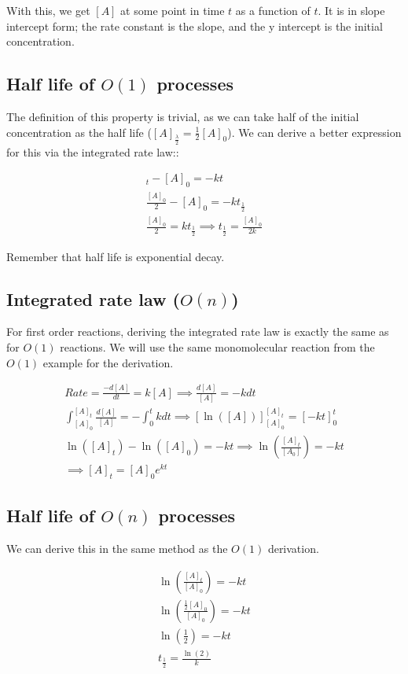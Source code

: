 \documentclass[12pt]{book}
\begin{document}
With this, we get $[A]$ at some point in time $t$ as a function of $t$. It is in slope intercept form; the rate constant is the slope, and the y intercept is the initial concentration.

\subsection*{Half life of $O(1)$ processes}

The definition of this property is trivial, as we can take half of the initial concentration as the half life ($[A]_{\frac{\lambda}{2}}=\frac{1}{2}[A]_0$). We can derive a better expression for this via the integrated rate law::

\begin{align}
    [A]_t-[A]_0=-kt\\
    \frac{[A]_0}{2}-[A]_0=-kt_{\frac{1}{2}}\\
    \frac{[A]_0}{2}=kt_{\frac{1}{2}}\implies t_{\frac{1}{2}}=\frac{[A]_0}{2k}
\end{align}

Remember that half life is exponential decay.

\subsection*{Integrated rate law ($O(n)$)}

For first order reactions, deriving the integrated rate law is exactly the same as for $O(1)$ reactions. We will use the same monomolecular reaction from the $O(1)$ example for the derivation.

\begin{align}
    Rate=\frac{-d[A]}{dt}=k[A]\implies \frac{d[A]}{[A]}=-kdt\\
    \int_{[A]_0}^{[A]_t}\frac{d[A]}{[A]}=-\int_{0}^{t}kdt\implies \left[\ln([A])\right]_{[A]_0}^{[A]_t}=\left[-kt\right]_{0}^{t}\\
    \ln([A]_t)-\ln([A]_0)=-kt\implies \ln\left(\frac{[A]_t}{[A_0]}\right)=-kt\\
    \implies [A]_t=[A]_0 e^{kt}
\end{align}
\newpage
\subsection*{Half life of $O(n)$ processes}

We can derive this in the same method as the $O(1)$ derivation.

\begin{align}
    \ln\left(\frac{[A]_t}{[A]_0}\right)=-kt\\
    \ln\left(\frac{\frac{1}{2}[A]_0}{[A]_0}\right)=-kt\\
    \ln\left(\frac{1}{2}\right)=-kt\\
    t_{\frac{1}{2}}=\frac{\ln(2)}{k}
\end{align}
\end{document}
